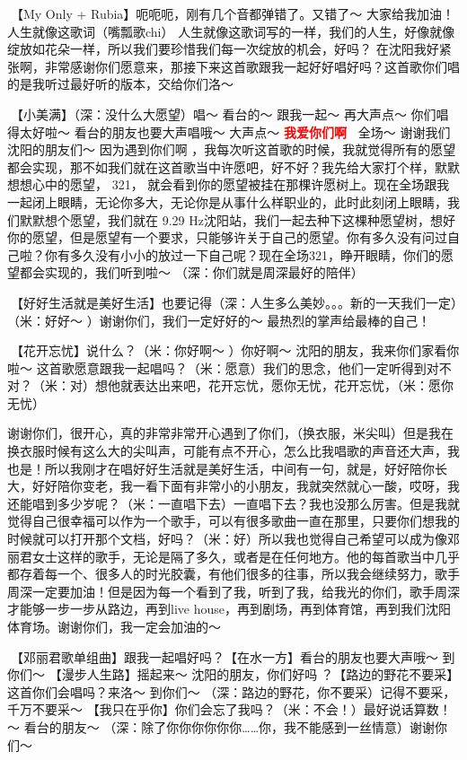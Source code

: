 \documentclass[
]{book}
\begin{document}
🎵【My Only + Rubia】呃呃呃，刚有几个音都弹错了。又错了～ 大家给我加油！人生就像这歌词（嘴瓢歌chi） 人生就像这歌词写的一样，我们的人生，好像就像绽放如花朵一样，所以我们要珍惜我们每一次绽放的机会，好吗？
在沈阳我好紧张啊，非常感谢你们愿意来，那接下来这首歌跟我一起好好唱好吗？这首歌你们唱的是我听过最好听的版本，交给你们洛～

🎵【小美满】（深：没什么大愿望）唱～ 看台的～ 跟我一起～ 再大声点～ 你们唱得太好啦～ 看台的朋友也要大声唱哦～ 大声点～ \textbf{\textcolor{red}{我爱你们啊~} } 全场～ 谢谢我们沈阳的朋友们～ 因为遇到你们啊 ，我每次听这首歌的时候，我就觉得所有的愿望都会实现，那不如我们就在这首歌当中许愿吧，好不好？我先给大家打个样，默默想想心中的愿望， 321， 就会看到你的愿望被挂在那棵许愿树上。现在全场跟我一起闭上眼睛，无论你多大，无论你是从事什么样职业的，此时此刻闭上眼睛，我们默默想个愿望，我们就在 9.29 Hz沈阳站，我们一起去种下这棵种愿望树，想好你的愿望，但是愿望有一个要求，只能够许关于自己的愿望。你有多久没有问过自己啦？你有多久没有小小的放过一下自己呢？现在全场321，睁开眼睛，你们的愿望都会实现的，我们听到啦～ （深：你们就是周深最好的陪伴）

🎵【好好生活就是美好生活】也要记得（深：人生多么美妙。。。新的一天我们一定）（米：好好～ ）谢谢你们，我们一定好好的～ 最热烈的掌声给最棒的自己！

🎵【花开忘忧】说什么？（米：你好啊～ ）你好啊～ 沈阳的朋友，我来你们家看你啦～ 这首歌愿意跟我一起唱吗？（米：愿意）我们的思念，他们一定听得到对不对？（米：对）想他就表达出来吧，花开忘忧，愿你无忧，花开忘忧，（米：愿你无忧）

谢谢你们，很开心，真的非常非常开心遇到了你们，（换衣服，米尖叫）但是我在换衣服时候有这么大的尖叫声，可能有点不开心，怎么比我唱歌的声音还大声，我也是！所以我刚才在唱好好生活就是美好生活，中间有一句，就是，好好陪你长大，好好陪你变老，我一看下面有非常小的小朋友，我就突然就心一酸，哎呀，我还能唱到多少岁呢？（米：一直唱下去）一直唱下去？我也没那么厉害。但是我就觉得自己很幸福可以作为一个歌手，可以有很多歌曲一直在那里，只要你们想我的时候就可以打开那个文档，好吗？（米：好）所以我也觉得自己希望可以成为像邓丽君女士这样的歌手，无论是隔了多久，或者是在任何地方。他的每首歌当中几乎都存着每一个、很多人的时光胶囊，有他们很多的往事，所以我会继续努力，歌手周深一定要加油！但是因为每一个看到了我，听到了我，给我光的你们，歌手周深才能够一步一步从路边，再到live house，再到剧场，再到体育馆，再到我们沈阳体育场。谢谢你们，我一定会加油的～

🎵【邓丽君歌单组曲】跟我一起唱好吗？【在水一方】看台的朋友也要大声哦～ 到你们～ 【漫步人生路】摇起来～ 沈阳的朋友，你们好吗？【路边的野花不要采】这首你们会唱吗？来洛～ 到你们～ （深：路边的野花，你不要采）记得不要采，千万不要采～ 【我只在乎你】你们会忘了我吗？（米：不会！）最好说话算数！～ 看台的朋友～ （深：除了你你你你你你\ldots\ldots 你，我不能感到一丝情意）谢谢你们～
\end{document}
